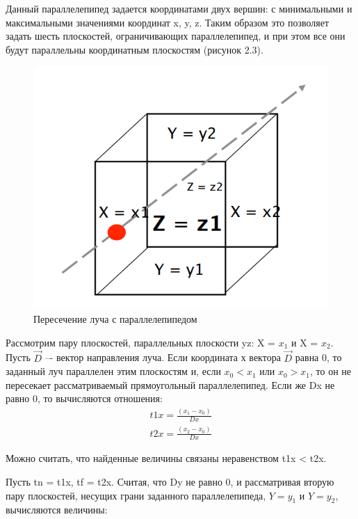 \documentclass[12pt,a4paper,oneside]{report}
\begin{document}
	 Данный параллелепипед задается координатами двух вершин: с минимальными и максимальными значениями координат x, y, z. Таким образом это позволяет задать шесть плоскостей, ограничивающих параллелепипед, и при этом  все они будут параллельны координатным плоскостям (рисунок 2.3).
	
	\begin{figure}[h]
		\centering
		\includegraphics[scale=0.7]{cube}
		\caption{Пересечение луча с параллелепипедом}
	\end{figure}

	 Рассмотрим пару плоскостей, параллельных плоскости yz: X = $x_1$ и X = $x_2$. Пусть $\vec{D}$ –- вектор направления луча. Если координата х вектора $\vec{D}$ равна 0, то заданный луч параллелен этим плоскостям и, если $x_0 < x_1$ или $x_0 > x_1$, то он не пересекает рассматриваемый прямоугольный параллелепипед. Если же Dx не равно 0, то вычисляются отношения:
	\begin{equation}
	\begin{gathered}
		t1x = \frac{(x_1 - x_0)}{Dx}\\
		t2x = \frac{(x_2 - x_0)}{Dx}
	\end{gathered}
	\end{equation}
	
	 Можно считать, что найденные величины связаны неравенством t1x < t2x.
	
	 Пусть tn = t1x, tf = t2x. Считая, что Dy не равно 0, и рассматривая вторую пару плоскостей, несущих грани заданного параллелепипеда, $Y = y_1$ и $Y = y_2$, вычисляются величины:
	
\end{document}

